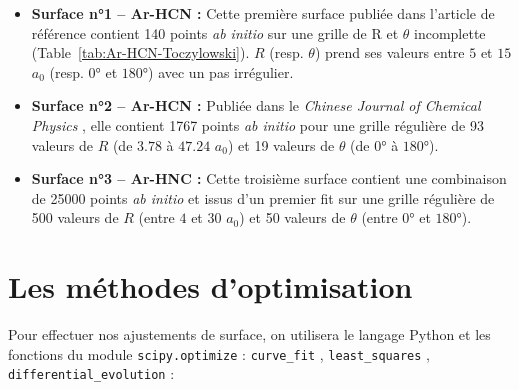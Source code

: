 \documentclass[11pt, a4paper, openany]{report}
\begin{document}
\begin{itemize}
  \item\label{itm:surf1} \textbf{Surface n°1 -- Ar-HCN :} Cette première surface publiée dans
    l'article de référence \cite{ref1} contient 140 points \textit{ab initio}
    sur une grille de R et $\theta$ incomplette 
    (Table~\ref{tab:Ar-HCN-Toczylowski}).
    $R$ (resp. $\theta$) prend ses valeurs entre $5$ et $15$ $a_0$ 
    (resp. $0$° et $180$°) avec un pas irrégulier.
  \item\label{itm:surf2} \textbf{Surface n°2 -- Ar-HCN :} Publiée dans le \textit{Chinese 
    Journal of Chemical Physics} \cite{ref2}, elle contient 1767 points
    \textit{ab initio} pour une grille régulière de 93 valeurs de $R$ (de 
    $3.78$ à $47.24$ $a_0$) et 19 valeurs de $\theta$ (de $0$° à $180$°).
  \item\label{itm:surf3} \textbf{Surface n°3 -- Ar-HNC : } Cette troisième surface \cite{refHNC} 
    contient une combinaison de 25000 points \textit{ab initio} et issus d'un
    premier fit sur une grille régulière de 500 valeurs de $R$ (entre $4$ et
    $30$ $a_0$) et 50 valeurs de $\theta$ (entre $0$° et $180$°).
\end{itemize}

\section{Les méthodes d'optimisation\label{sec:methodes}}

\noindent Pour effectuer nos ajustements de surface, on utilisera le langage 
Python et les fonctions du module \verb|scipy.optimize| : 
\verb|curve_fit| \cite{curve_fit}, \verb|least_squares| \cite{least_squares},
\verb|differential_evolution| \cite{differential_evolution} :\\
\end{document}
